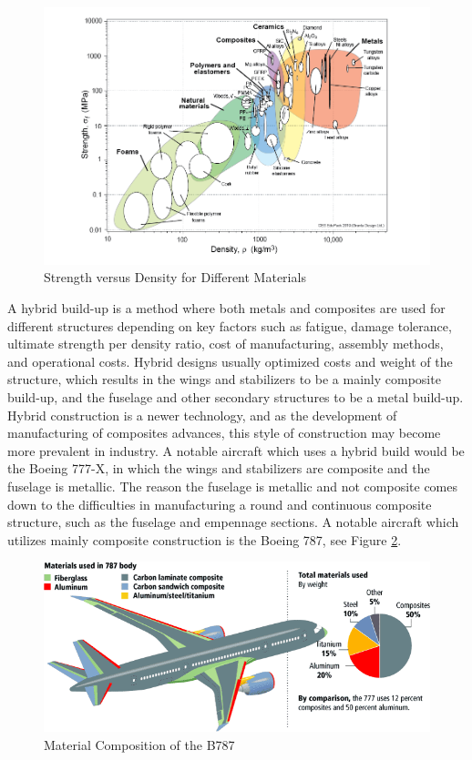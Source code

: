 \begin{figure}[!h]
    \centering
    \includegraphics[width=\linewidth]{Photos/strength_density.png}
    \caption{Strength versus Density for Different Materials \cite{ashby}}
    \label{fig:strength_density}
\end{figure}

A hybrid build-up is a method where both metals and composites are used for different structures depending on key factors such as fatigue, damage tolerance, ultimate strength per density ratio, cost of manufacturing, assembly methods, and operational costs. Hybrid designs usually optimized costs and weight of the structure, which results in the wings and stabilizers to be a mainly composite build-up, and the fuselage and other secondary structures to be a metal build-up. Hybrid construction is a newer technology, and as the development of manufacturing of composites advances, this style of construction may become more prevalent in industry. A notable aircraft which uses a hybrid build would be the Boeing 777-X, in which the wings and stabilizers are composite and the fuselage is metallic. The reason the fuselage is metallic and not composite comes down to the difficulties in manufacturing a round and continuous composite structure, such as the fuselage and empennage sections. A notable aircraft which utilizes mainly composite construction is the Boeing 787, see Figure \ref{fig:787 materials}.

\begin{figure}[!h]
    \centering
    \includegraphics[width=\linewidth]{Photos/787 Materials.png}
    \caption{Material Composition of the B787 \cite{787_Mat}}
    \label{fig:787 materials}
\end{figure}

